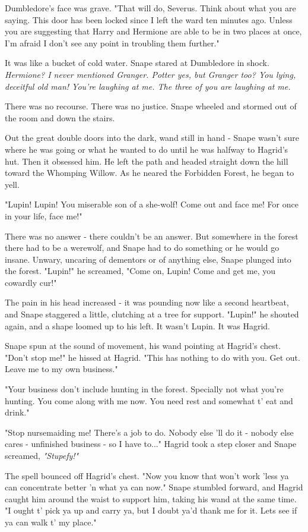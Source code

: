 \documentclass[a4paper,11pt]{article}
\begin{document}
Dumbledore's face was grave. "That will do, Severus. Think about what you are saying. This door has been locked since I left the ward ten minutes ago. Unless you are suggesting that Harry and Hermione are able to be in two places at once, I'm afraid I don't see any point in troubling them further."

It was like a bucket of cold water. Snape stared at Dumbledore in shock. \emph{Hermione? I never mentioned Granger. Potter yes, but Granger too? You lying, deceitful old man! You're laughing at me. The three of you are laughing at me.}

There was no recourse. There was no justice. Snape wheeled and stormed out of the room and down the stairs.

Out the great double doors into the dark, wand still in hand - Snape wasn't sure where he was going or what he wanted to do until he was halfway to Hagrid's hut. Then it obsessed him. He left the path and headed straight down the hill toward the Whomping Willow. As he neared the Forbidden Forest, he began to yell.

"Lupin! Lupin! You miserable son of a she-wolf! Come out and face me! For once in your life, face me!"

There was no answer - there couldn't be an answer. But somewhere in the forest there had to be a werewolf, and Snape had to do something or he would go insane. Unwary, uncaring of dementors or of anything else, Snape plunged into the forest. "Lupin!" he screamed, "Come on, Lupin! Come and get me, you cowardly cur!"

The pain in his head increased - it was pounding now like a second heartbeat, and Snape staggered a little, clutching at a tree for support. "Lupin!" he shouted again, and a shape loomed up to his left. It wasn't Lupin. It was Hagrid.

Snape spun at the sound of movement, his wand pointing at Hagrid's chest. "Don't stop me!" he hissed at Hagrid. "This has nothing to do with you. Get out. Leave me to my own business."

"Your business don't include hunting in the forest. Specially not what you're hunting. You come along with me now. You need rest and somewhat t' eat and drink."

"Stop nursemaiding me! There's a job to do. Nobody else 'll do it - nobody else cares - unfinished business - so I have to..." Hagrid took a step closer and Snape screamed, \emph{"Stupefy!"}

The spell bounced off Hagrid's chest. "Now you know that won't work 'less ya can concentrate better 'n what ya can now." Snape stumbled forward, and Hagrid caught him around the waist to support him, taking his wand at the same time. "I ought t' pick ya up and carry ya, but I doubt ya'd thank me for it. Lets see if ya can walk t' my place."
\end{document}
